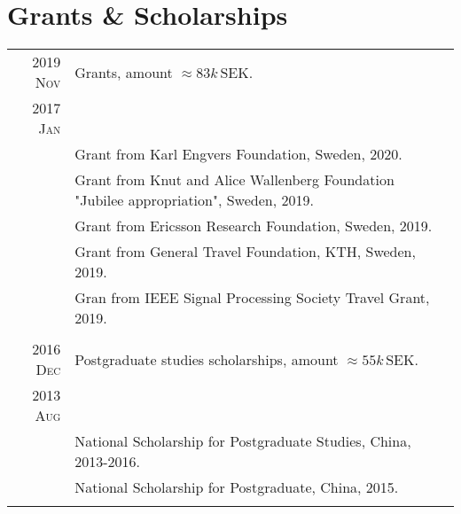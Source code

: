 \documentclass[a4paper,10pt]{article}
\begin{document}
\section{Grants \& Scholarships}
\begin{savenotes}
  \begin{longtable}{r|p{13cm}}
    \textsc{2019 Nov} & Grants, amount $\approx 83k\,\mathrm{SEK}$.\\
    \textsc{2017 Jan} & {} \\
                      & Grant from Karl Engvers Foundation, Sweden, 2020. \\

                      &  Grant from Knut and Alice Wallenberg Foundation
                        "Jubilee appropriation", Sweden, 2019. \\
                      & Grant from Ericsson Research Foundation, Sweden, 2019. \\
                      & Grant from General Travel Foundation, KTH, Sweden, 2019. \\
                      & Gran from IEEE Signal Processing Society Travel Grant, 2019. \\
    \multicolumn{2}{c}{} \\
    \textsc{2016 Dec} & Postgraduate studies scholarships, amount $\approx 55k\,\mathrm {SEK}$. \\
    \textsc{2013 Aug} & \\
                      & National Scholarship for Postgraduate Studies, China, 2013-2016. \\
                      & National Scholarship for Postgraduate, China, 2015.\\
    \multicolumn{2}{c}{} \\


\end{longtable}
\end{savenotes}
\end{document}
